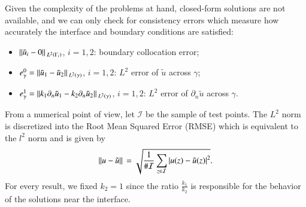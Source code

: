 \documentclass[5p,authoryear]{elsarticle}
\begin{document}
Given the complexity of the problems at hand, closed-form solutions are not available, and we can only check for consistency errors which measure how accurately the interface and boundary conditions are satisfied:
\begin{itemize}
    \item \(\norm*{\tilde{u}_i - 0}_{L^2(\Gamma_i)}\), \(i=1, 2\): boundary collocation error;
    \item \(e_\gamma^0 = \norm*{\tilde{u}_1 - \tilde{u}_2}_{L^2(\gamma)}\), \(i=1, 2\): \(L^2\) error of \(\tilde{u}\) across \(\gamma\);
    \item \(e_\gamma^1 = \norm*{k_1 \partial_n\tilde{u}_1 - k_2 \partial_n\tilde{u}_2}_{L^2(\gamma)}\), \(i=1, 2\): \(L^2\) error of \(\partial_n\tilde{u}\) across \(\gamma\).
\end{itemize}
From a numerical point of view, let \(\mathcal{I}\) be the sample of test points. The \(L^2\) norm is discretized into the Root Mean Squared Error (RMSE) which is equivalent to the \(l^2\) norm and is given by
\[
    \norm*{u-\tilde{u}}= \sqrt{\frac{1}{\#\mathcal{I}} \sum_{z \in \mathcal{I}} \abs{u(z)-\tilde{u}(z)}^2}.
\]
For every result, we fixed \(k_2=1\) since the ratio \(\frac{k_1}{k_2}\) is responsible for the behavior of the solutions near the interface.
\end{document}
